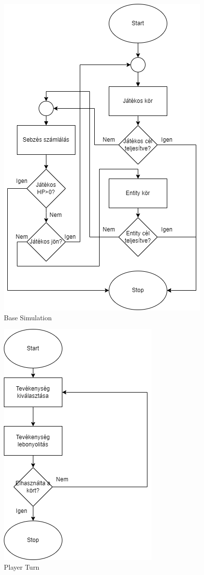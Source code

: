 \begin{figure}[!ht]
	\centering
	\includegraphics[scale=0.8]{images/gameUML.png}
	\caption{Base Simulation}
	\label{fig:basegame}
\end{figure}

\begin{figure}[!ht]
	\centering
	\includegraphics[scale=1]{images/playerturnUML.png}
	\caption{Player Turn}
	\label{fig:playerturn}
\end{figure}

